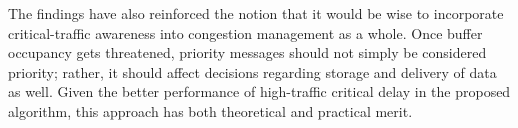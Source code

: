 The findings have also reinforced the notion that it would be wise to incorporate critical-traffic awareness into congestion management as a whole. Once buffer occupancy gets threatened, priority messages should not simply be considered priority; rather, it should affect decisions regarding storage and delivery of data as well. Given the better performance of high-traffic critical delay in the proposed algorithm, this approach has both theoretical and practical merit.
